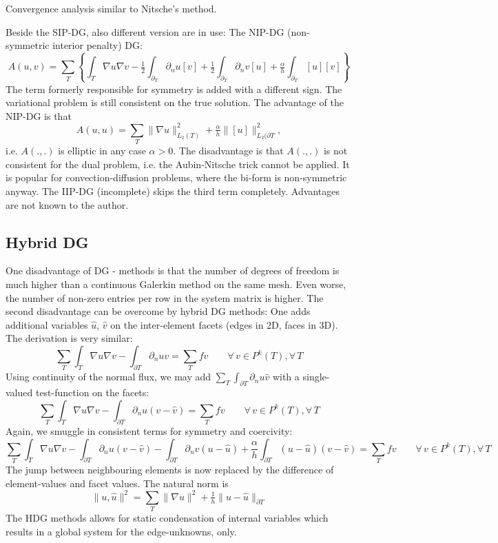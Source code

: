 Convergence analysis similar to Nitsche's method.


Beside the SIP-DG, also different version are in use: The NIP-DG
(non-symmetric interior penalty) DG:
$$
A(u,v) = \sum_T \left\{ \int_T \nabla u \nabla v
  - \tfrac{1}{2} \int_{\partial_T} \partial_n u [v]  
+ \tfrac{1}{2} \int_{\partial_T} \partial_n v [u] 
  +  \tfrac{\alpha}{h} \int_{\partial_T} [u] [v] \right\}
$$
The term formerly responsible for symmetry is added with a different
sign. The variational problem is still consistent on the true
solution. The advantage of the NIP-DG is that
$$
A(u,u) = \sum_T \| \nabla u \|^2_{L_2(T)} + \tfrac{\alpha}{h} \| [u]
\|_{L_2(\partial T}^2,
$$
i.e. $A(.,.)$ is elliptic in any case $\alpha > 0$. The disadvantage
is that $A(.,.)$ is not consistent for the dual problem, i.e. the
Aubin-Nitsche trick cannot be applied. It is popular for
convection-diffusion problems, where the bi-form is non-symmetric
anyway. The IIP-DG (incomplete) skips the third term
completely. Advantages are not known to the author.

\subsection{Hybrid DG}
One disadvantage of DG - methods is that the number of degrees of
freedom is much higher than a continuous Galerkin method on the same
mesh. Even worse, the number of non-zero entries per row in the system
matrix is higher. The second disadvantage can be overcome by hybrid DG
methods: One adds additional variables $\hat u$, $\hat v$ on the inter-element facets (edges in 2D,
faces in 3D). The derivation is very similar:
$$
\sum_T \int_T \nabla u \nabla v - \int_{\partial T} \partial_n u v = \sum_T f  
v  \qquad \forall \, v \in P^k(T), \forall \, T  
$$ 
Using continuity of the normal flux, we may add $\sum_T \int_{\partial
  T} \partial_n u \hat v$ with a single-valued test-function on the
facets:
$$
\sum_T \int_T \nabla u \nabla v - \int_{\partial T} \partial_n u
(v-\hat v) = \sum_T f 
v  \qquad \forall \, v \in P^k(T), \forall \, T 
$$
Again, we smuggle in consistent terms for symmetry and coercivity:
$$
\sum_T \int_T \nabla u \nabla v
 - \int_{\partial T} \partial_n u (v-\hat v) 
 - \int_{\partial T} \partial_n v (u-\hat u) 
 + \frac{\alpha}{h} \int_{\partial T}  (u-\hat u) (v-\hat v) 
= \sum_T f 
v  \qquad \forall \, v \in P^k(T), \forall \, T 
$$
The jump between neighbouring elements is now replaced by the
difference of element-values and facet values. The natural norm is
$$
\| u, \hat u\|^2 = \sum_T \| \nabla u \|^2 + \tfrac{1}{h}  \| u - \hat
u \|_{\partial T}
$$
The HDG methods allows for static condensation of internal variables
which results in a global system for the edge-unknowns, only.

